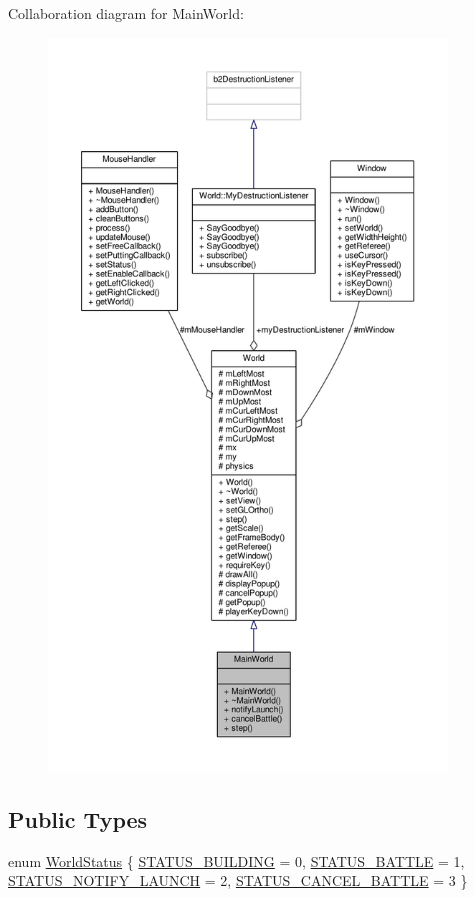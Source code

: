 Collaboration diagram for Main\+World\+:\nopagebreak
\begin{figure}[H]
\begin{center}
\leavevmode
\includegraphics[height=550pt]{classMainWorld__coll__graph}
\end{center}
\end{figure}
\subsection*{Public Types}
\begin{DoxyCompactItemize}
\item 
enum \hyperlink{classMainWorld_ab0b1d1d54026f907ddc7fcc858ea48f3}{World\+Status} \{ \hyperlink{classMainWorld_ab0b1d1d54026f907ddc7fcc858ea48f3af96d574a62f6b5920f3fad277d995fb7}{S\+T\+A\+T\+U\+S\+\_\+\+B\+U\+I\+L\+D\+I\+N\+G} = 0, 
\hyperlink{classMainWorld_ab0b1d1d54026f907ddc7fcc858ea48f3a56955ec18d3375dec123f1d3d65c7393}{S\+T\+A\+T\+U\+S\+\_\+\+B\+A\+T\+T\+L\+E} = 1, 
\hyperlink{classMainWorld_ab0b1d1d54026f907ddc7fcc858ea48f3adf5d74eb401b14e4f5f33d375d6ffedd}{S\+T\+A\+T\+U\+S\+\_\+\+N\+O\+T\+I\+F\+Y\+\_\+\+L\+A\+U\+N\+C\+H} = 2, 
\hyperlink{classMainWorld_ab0b1d1d54026f907ddc7fcc858ea48f3a0adce04cf20701967507ab5eb64e2011}{S\+T\+A\+T\+U\+S\+\_\+\+C\+A\+N\+C\+E\+L\+\_\+\+B\+A\+T\+T\+L\+E} = 3
 \}
\end{DoxyCompactItemize}
